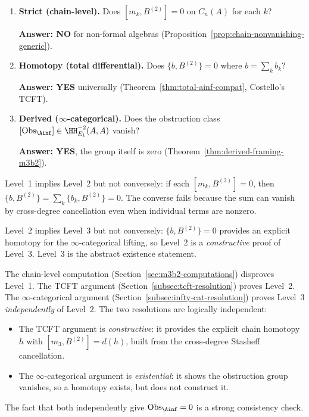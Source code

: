 \begin{definition}
\label{def:three-levels}
\mbox{}
\begin{enumerate}[label=\textup{Level \arabic*.}]
 \item \textbf{Strict (chain-level).}
  Does $[m_k, B^{(2)}] = 0$ on $C_n(A)$ for each $k$?

  \textbf{Answer: NO} for non-formal algebras
  (Proposition~\ref{prop:chain-nonvanishing-generic}).

 \item \textbf{Homotopy (total differential).}
  Does $\{b, B^{(2)}\} = 0$ where $b = \sum_k b_k$?

  \textbf{Answer: YES} universally
  (Theorem~\ref{thm:total-ainf-compat}, Costello's TCFT).

 \item \textbf{Derived ($\infty$-categorical).}
  Does the obstruction class
  $[\mathrm{Obs}_{\Ainf}] \in \HH^{-2}_{E_1}(A, A)$ vanish?

  \textbf{Answer: YES}, the group itself is zero
  (Theorem~\ref{thm:derived-framing-m3b2}).
\end{enumerate}
\end{definition}

\begin{remark}
\label{rem:three-level-relationship}
Level~1 implies Level~2 but not conversely: if each $[m_k, B^{(2)}] = 0$,
then $\{b, B^{(2)}\} = \sum_k \{b_k, B^{(2)}\} = 0$.  The
converse fails because the sum can vanish by cross-degree
cancellation even when individual terms are nonzero.

Level~2 implies Level~3 but not conversely: $\{b, B^{(2)}\} = 0$
provides an explicit homotopy for the $\infty$-categorical
lifting, so Level~2 is a \emph{constructive} proof of Level~3.
Level~3 is the abstract existence statement.

The chain-level computation
(Section~\ref{sec:m3b2-computations}) disproves Level~1.
The TCFT argument (Section~\ref{subsec:tcft-resolution})
proves Level~2.  The $\infty$-categorical argument
(Section~\ref{subsec:infty-cat-resolution}) proves Level~3
\emph{independently} of Level~2.  The two resolutions
are logically independent:
\begin{itemize}
 \item The TCFT argument is \emph{constructive}: it provides the
  explicit chain homotopy $h$ with $[m_3, B^{(2)}] = d(h)$,
  built from the cross-degree Stasheff cancellation.
 \item The $\infty$-categorical argument is \emph{existential}:
  it shows the obstruction group vanishes, so a homotopy exists,
  but does not construct it.
\end{itemize}
The fact that both independently give $\mathrm{Obs}_{\Ainf} = 0$
is a strong consistency check.
\end{remark}

